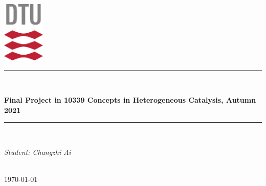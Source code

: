 \documentclass{article}
\begin{document}
\begin{titlepage}
\newcommand{\HRule}{\rule{\linewidth}{0.5mm}} %
\center %
\includegraphics[width=0.15\textwidth]{Pictures/DTU-logo.pdf}
\\[0.5cm]
\HRule \\[0.8cm]
{ \huge \bfseries Final Project in 10339 Concepts in Heterogeneous Catalysis, Autumn 2021\\[0.4cm] %
\HRule \\[3cm]
\begin{minipage}{0.8\textwidth}
\begin{center} 
\emph{Student: Changzhi Ai} 
\end{center}
\end{minipage}\\[2cm]
{\large 
\today %
}
\\[0.2cm] %
}\end{titlepage}
\end{document}
